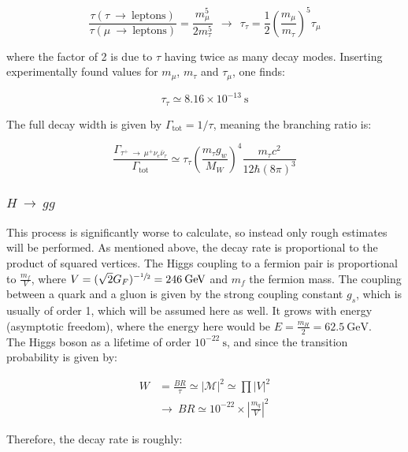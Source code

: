 \documentclass[11pt,a4paper]{article}
\begin{document}
\begin{equation}
	\frac{\tau(\tau\:\rightarrow\:\text{leptons})}{\tau(\mu\:\rightarrow\:\text{leptons})} = \frac{m_\mu^5}{2m_\tau^5} \:\:\longrightarrow\:\: \tau_\tau = \frac{1}{2}\left(\frac{m_\mu}{m_\tau}\right)^5\tau_\mu
\end{equation}

where the factor of 2 is due to $\tau$ having twice as many decay modes. Inserting experimentally found values for $m_\mu$, $m_\tau$ and $\tau_\mu$, one finds:

\begin{equation}
	\tau_\tau \simeq 8.16\times 10^{-13}\:\text{s}
\end{equation}

The full decay width is given by $\Gamma_{\text{tot}} = 1/\tau$, meaning the branching ratio is:

\begin{equation}
	\frac{\Gamma_{\tau^+ \:\rightarrow\: \mu^+\nu_e\bar{\nu}_\tau}}{\Gamma_{\text{tot}}} \simeq \tau_\tau\left(\frac{m_\tau g_w}{M_W}\right)^4 \frac{m_\tau c^2}{12\hbar(8\pi)^3}
\end{equation}

\subsubsection{$H \:\rightarrow\: gg$}
This process is significantly worse to calculate, so instead only rough estimates will be performed. As mentioned above, the decay rate is proportional to the product of squared vertices. The Higgs coupling to a fermion pair is proportional to $\frac{m_f}{V}$, where $V=(\sqrt{2}G_F)^{-\sfrac{1}{2}} = 246\:\text{GeV}$ and $m_f$ the fermion mass. The coupling between a quark and a gluon is given by the strong coupling constant $g_s$, which is usually of order 1, which will be assumed here as well. It grows with energy (asymptotic freedom), where the energy here would be $E = \frac{m_H}{2} = 62.5\:\text{GeV}$.\\
The Higgs boson as a lifetime of order $10^{-22}\:\text{s}$, and since the transition probability is given by:

\begin{align*}
	W &= \frac{BR}{\tau} \simeq |\mathcal{M}|^2 \simeq \prod |V|^2\\
	&\rightarrow\: BR \simeq 10^{-22}\times\left|\frac{m_q}{V}\right|^2
\end{align*}

Therefore, the decay rate is roughly:
\end{document}
